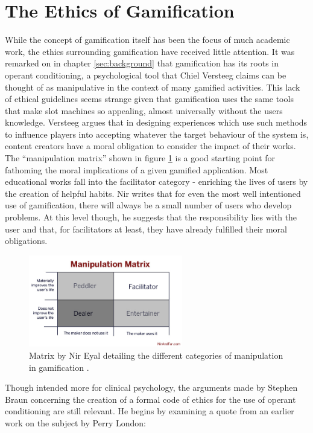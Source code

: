 \documentclass[12pt,a4paper,twoside]{report}
\begin{document}
\section{The Ethics of Gamification}
While the concept of gamification itself has been the focus of much academic work, the ethics surrounding gamification have received little attention. It was remarked on in chapter \ref{sec:background} that gamification has its roots in operant conditioning, a psychological tool that Chiel Versteeg claims \cite{versteeg2013ethics} can be thought of as manipulative in the context of many gamified activities. This lack of ethical guidelines seems strange given that gamification uses the same tools that make slot machines so appealing, almost universally without the users knowledge. Versteeg argues that in designing experiences which use such methods to influence players into accepting whatever the target behaviour of the system is, content creators have a moral obligation to consider the impact of their works. The ``manipulation matrix'' shown in figure \ref{matrix} is a good starting point for fathoming the moral implications of a given gamified application. Most educational works fall into the facilitator category - enriching the lives of users by the creation of helpful habits. Nir writes that for even the most well intentioned use of gamification, there will always be a small number of users who develop problems. At this level though, he suggests that the responsibility lies with the user and that, for facilitators at least, they have already fulfilled their moral obligations.

\begin{figure}
	\begin{center}
		\includegraphics[width=0.6\textwidth]{../img/matrix.jpg}
		\caption{Matrix by Nir Eyal detailing the different categories of manipulation in gamification \cite{Eyal2013}.}
		\label{matrix}
	\end{center}
\end{figure}

Though intended more for clinical psychology, the arguments made by Stephen Braun \cite{braun1975ethical} concerning the creation of a formal code of ethics for the use of operant conditioning are still relevant. He begins by examining a quote from an earlier work on the subject by Perry London:
\end{document}
